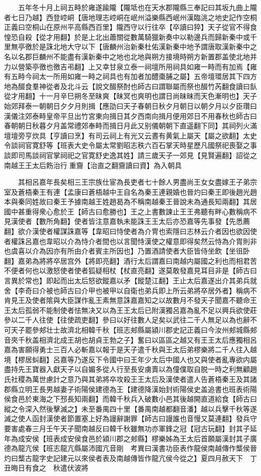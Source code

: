 　　五年冬十月上祠五畤於雍遂踰隴【隴坻也在天水郡隴縣三奉記曰其坂九曲上隴者七日乃越】西登崆峒【唐地理志崆峒在岷州溢樂縣西岷州漢臨洮之地史記作空桐正義曰空桐山在原州平高縣西百里】隴西守以行往卒【卒讀曰猝】天子從官不得食惶恐自殺【從才用翻】於是上北出蕭關從數萬騎獵新奏中以勒邊兵而歸新秦中或千里無亭徼於是誅北地大守以下【唐麟州治新秦杜佑漢新秦中地予謂唐取漢新秦中之名以名郡巨麟州不能盡有漢新秦中之地也北地與朔方接境時朔方新置郡盖使北地并力以營築亭徼也徼吉弔翻】上又幸甘泉立泰一祠壇所用祠具如雍一畤而有加焉【雍有五畤今祠太一所用如雍一畤之祠具也有加者加醴棗脯之屬】五帝壇環居其下四方地為醊食羣神從者及北斗云【說文醊祭酎也師古曰謂聯屬而祭也醊竹芮翻食讀曰飤從才用翻】十一月辛巳朔冬至昧爽【昧冥也爽明也謂日尚昧昧而天色漸明也】天子始郊拜泰一朝朝日夕夕月則揖【應劭曰天子春朝日秋夕月朝日以朝夕月以夕臣瓚曰漢儀注郊泰畤皇帝平旦出竹宮東向揖日其夕西南向揖月便用郊日不用春秋也師古曰春朝朝日秋暮夕月盖常禮郊奉畤而揖日月此又别儀朝朝下直遥翻下同】其祠列火滿壇壇旁亨炊具【亨讀曰烹】有司云祠上有光又云晝有黄氣上屬天【屬之欲翻】太史令談祠官寛舒等【班表大史令屬太常劉昭志秩六百石掌天時星歷凡國祭祀喪娶之事談即司馬談祠官掌祠祀之官寛舒史逸其姓】請三歲天子一郊見【見賢遍翻】詔從之南越王王太后飭治行重齎【治直之翻齎讀曰資】為入朝具

　　其相呂嘉年長矣相三王宗族仕宦為長吏者七十餘人男盡尚王女女盡嫁王子弟宗室及蒼梧秦王有連【孟康曰蒼梧越中王自名為秦王連親婚也晉灼曰秦王即後趙光趙本與秦同姓故曰秦王予據南越王姓趙曷為不稱南越秦王晉說未為通長知兩翻】其居國中甚重得衆心愈於王【師古曰愈勝也】王之上書數諫止王王弗聽有畔心數稱病不見漢使者【數所角翻】使者皆注意嘉執未能誅王王太后亦恐嘉等先事發【先悉薦翻】欲介漢使者權謀誅嘉等【韋昭曰恃使者為介冑也索隱曰志林云介者因也欲因使者權誅呂嘉也韋昭以介為恃介者間也以言聞恃漢使之權意即得矣然云恃為介胄則非也虞喜以介為因亦有所由介者賓主所因也】乃置酒請使者大臣皆侍坐飲【坐徂卧翻】嘉弟為將將卒居宫外【將即亮翻】酒行太后謂嘉曰南越内屬國之利也而相君苦不便者何也以激怒使者使者狐疑相杖【杖直亮翻】遂莫敢發嘉見耳目非是【師古曰言異於常也】即起而出太后怒欲鏦嘉以矛【鏦楚江翻】王止太后嘉遂出介其弟兵就舍【李奇曰介被也師古曰介甲也被甲以自衛也弟兵即上所云弟將卒居外者】稱病不肯見王及使者隂與大臣謀作亂王素無意誅嘉嘉知之以故數月不發天子聞嘉不聽命王王太后孤弱不能制使者怯無决又以為王王太后已附漢獨呂嘉為亂不足以興兵欲使莊參以二千人往使【往使疏吏翻】參曰以好往數人足矣以武往二千人無足以為也辭不可天子罷參郟壮士故濟北相韓千秋【班志郟縣屬潁川郡史記正義曰今汝州郟城縣郟音夾千秋盖相濟北成王胡也胡貞王勃之子】奮曰以區區之越又有王王太后應獨相呂嘉為害願得勇士三百人必斬嘉以報于是天子遣千秋與王太后弟樛樂將二千人往入越境【樛居虯翻】呂嘉等乃遂反下令國中曰王年少太后中國人也又與使者亂專欲内屬盡持先王寶器入獻天子以自媚多從人行至長安虜賣以為僮僕取自脱一時之利無顧趙氏社稷為萬世慮計之意乃與其弟將卒攻殺王王太后及漢使者遣人告蒼梧秦王及其諸郡縣立明王長男越妻子術陽侯建德為王【建德降漢始封術陽侯史盖追書也班表術陽侯食邑於東海之下邳長知兩翻】而韓千秋兵入破數小邑其後越開直道給食【師古曰縱之令深入然後擊滅之】未至番禺四十里【番禺南越都翻音潘】越以兵擊千秋等遂滅之使人函封漢使者節置塞上好為謾辭謝罪【師古曰謾誰也音慢又莫連翻】發兵守要害處春三月壬午天子聞南越反曰韓千秋雖無功亦軍鋒之冠【冠古玩翻】封其子延年為成安侯【班表成安侯食邑於潁川郡之郟縣】樛樂姊為王太后首願屬漢封其子廣德為龍亢侯【班志龍亢縣屬沛國亢音剛　考異曰漢書功臣表作龍侯南越傳作㰍侯晉灼曰㰍古龍字史記建元以來侯者表及南越傳皆作龍亢侯今從之】夏四月赦天下　丁丑晦日有食之　秋遣伏波將

